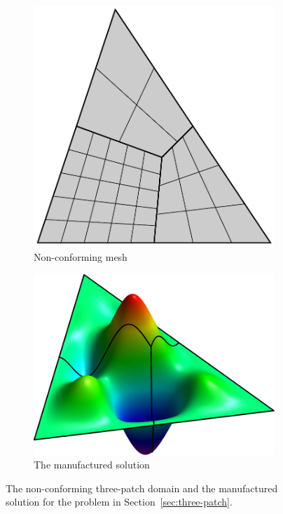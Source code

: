 \begin{figure}[ht]
	\centering
	\begin{subfigure}[b]{0.33\textwidth}
		\includegraphics[width=\textwidth]{three_patch_basic}
		\caption{Non-conforming mesh}
	\end{subfigure}
	\begin{subfigure}[b]{0.41\textwidth}
		\includegraphics[width=\textwidth]{three_patches_solution-plot}
		\caption{The manufactured solution}
	\end{subfigure}
	\caption{The non-conforming three-patch domain and the manufactured solution for the problem in Section~\ref{sec:three-patch}.}\label{fig:three_patch_biharmonic_problem}
\end{figure}

